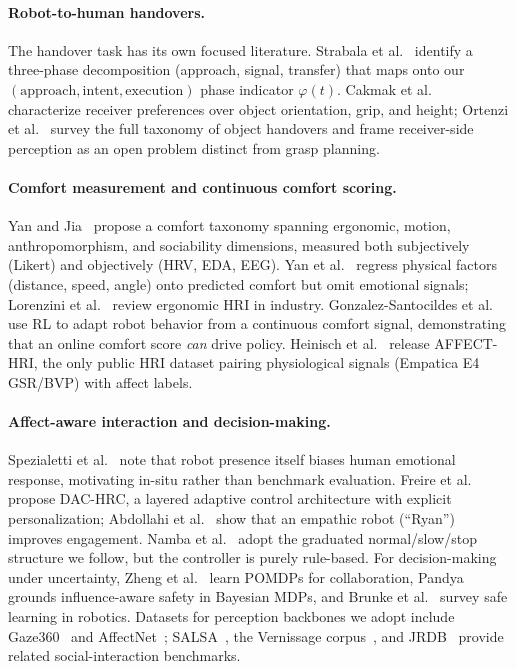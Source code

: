 \documentclass{article}
\begin{document}
\paragraph{Robot-to-human handovers.} The handover task has its own focused literature. Strabala et al.~\cite{strabala2013} identify a three-phase decomposition (approach, signal, transfer) that maps onto our $(\text{approach}, \text{intent}, \text{execution})$ phase indicator $\varphi(t)$. Cakmak et al.~\cite{cakmak2011} characterize receiver preferences over object orientation, grip, and height; Ortenzi et al.~\cite{ortenzi2021} survey the full taxonomy of object handovers and frame receiver-side perception as an open problem distinct from grasp planning.

\paragraph{Comfort measurement and continuous comfort scoring.} Yan and Jia~\cite{ref05} propose a comfort taxonomy spanning ergonomic, motion, anthropomorphism, and sociability dimensions, measured both subjectively (Likert) and objectively (HRV, EDA, EEG). Yan et al.~\cite{ref06} regress physical factors (distance, speed, angle) onto predicted comfort but omit emotional signals; Lorenzini et al.~\cite{ref07} review ergonomic HRI in industry. Gonzalez-Santocildes et al.~\cite{ref08} use RL to adapt robot behavior from a continuous comfort signal, demonstrating that an online comfort score \emph{can} drive policy. Heinisch et al.~\cite{ref09} release AFFECT-HRI, the only public HRI dataset pairing physiological signals (Empatica E4 GSR/BVP) with affect labels.

\paragraph{Affect-aware interaction and decision-making.} Spezialetti et al.~\cite{ref10} note that robot presence itself biases human emotional response, motivating in-situ rather than benchmark evaluation. Freire et al.~\cite{ref11} propose DAC-HRC, a layered adaptive control architecture with explicit personalization; Abdollahi et al.~\cite{ref12} show that an empathic robot (``Ryan'') improves engagement. Namba et al.~\cite{ref13} adopt the graduated normal/slow/stop structure we follow, but the controller is purely rule-based. For decision-making under uncertainty, Zheng et al.~\cite{ref14} learn POMDPs for collaboration, Pandya~\cite{ref15} grounds influence-aware safety in Bayesian MDPs, and Brunke et al.~\cite{ref17} survey safe learning in robotics. Datasets for perception backbones we adopt include Gaze360~\cite{ref25} and AffectNet~\cite{ref26}; SALSA~\cite{ref22}, the Vernissage corpus~\cite{ref23}, and JRDB~\cite{ref24} provide related social-interaction benchmarks.
\end{document}
